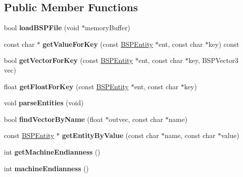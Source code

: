 \subsection*{Public Member Functions}
\begin{DoxyCompactItemize}
\item 
\hypertarget{class_bsp_loader_a2289f6742cdee9a53bc90edac41fad6a}{bool {\bfseries load\+B\+S\+P\+File} (void $\ast$memory\+Buffer)}\label{class_bsp_loader_a2289f6742cdee9a53bc90edac41fad6a}

\item 
\hypertarget{class_bsp_loader_a643b7e4eed8d286570dd415aac2332c4}{const char $\ast$ {\bfseries get\+Value\+For\+Key} (const \hyperlink{struct_b_s_p_entity}{B\+S\+P\+Entity} $\ast$ent, const char $\ast$key) const }\label{class_bsp_loader_a643b7e4eed8d286570dd415aac2332c4}

\item 
\hypertarget{class_bsp_loader_a783e9d10471afbb146b460bdd863861d}{bool {\bfseries get\+Vector\+For\+Key} (const \hyperlink{struct_b_s_p_entity}{B\+S\+P\+Entity} $\ast$ent, const char $\ast$key, B\+S\+P\+Vector3 vec)}\label{class_bsp_loader_a783e9d10471afbb146b460bdd863861d}

\item 
\hypertarget{class_bsp_loader_a7208d016f59a90e762f8da25365d5126}{float {\bfseries get\+Float\+For\+Key} (const \hyperlink{struct_b_s_p_entity}{B\+S\+P\+Entity} $\ast$ent, const char $\ast$key)}\label{class_bsp_loader_a7208d016f59a90e762f8da25365d5126}

\item 
\hypertarget{class_bsp_loader_a8c84bcd8996a688a4bd3077ef4ca147b}{void {\bfseries parse\+Entities} (void)}\label{class_bsp_loader_a8c84bcd8996a688a4bd3077ef4ca147b}

\item 
\hypertarget{class_bsp_loader_ae97843508dbbdc216cf564e1a58c117f}{bool {\bfseries find\+Vector\+By\+Name} (float $\ast$outvec, const char $\ast$name)}\label{class_bsp_loader_ae97843508dbbdc216cf564e1a58c117f}

\item 
\hypertarget{class_bsp_loader_ac2f58b850e3bded56d821b18118422fb}{const \hyperlink{struct_b_s_p_entity}{B\+S\+P\+Entity} $\ast$ {\bfseries get\+Entity\+By\+Value} (const char $\ast$name, const char $\ast$value)}\label{class_bsp_loader_ac2f58b850e3bded56d821b18118422fb}

\item 
\hypertarget{class_bsp_loader_a96ac12304bb52f09f48aa2bfa44c89b0}{int {\bfseries get\+Machine\+Endianness} ()}\label{class_bsp_loader_a96ac12304bb52f09f48aa2bfa44c89b0}

\item 
\hypertarget{class_bsp_loader_a98d3b0a669e649fa41d657fb63d6fc7d}{int {\bfseries machine\+Endianness} ()}\label{class_bsp_loader_a98d3b0a669e649fa41d657fb63d6fc7d}

\end{DoxyCompactItemize}
